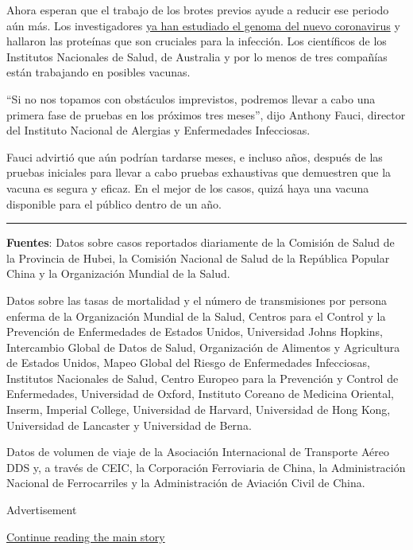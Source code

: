 Ahora esperan que el trabajo de los brotes previos ayude a reducir ese
periodo aún más. Los investigadores
\href{https://ncbiinsights.ncbi.nlm.nih.gov/2020/01/13/novel-coronavirus/}{ya
han estudiado el genoma del nuevo coronavirus} y hallaron las proteínas
que son cruciales para la infección. Los científicos de los Institutos
Nacionales de Salud, de Australia y por lo menos de tres compañías están
trabajando en posibles vacunas.

``Si no nos topamos con obstáculos imprevistos, podremos llevar a cabo
una primera fase de pruebas en los próximos tres meses'', dijo Anthony
Fauci, director del Instituto Nacional de Alergias y Enfermedades
Infecciosas.

Fauci advirtió que aún podrían tardarse meses, e incluso años, después
de las pruebas iniciales para llevar a cabo pruebas exhaustivas que
demuestren que la vacuna es segura y eficaz. En el mejor de los casos,
quizá haya una vacuna disponible para el público dentro de un año.

\begin{center}\rule{0.5\linewidth}{\linethickness}\end{center}

\textbf{Fuentes}: Datos sobre casos reportados diariamente de la
Comisión de Salud de la Provincia de Hubei, la Comisión Nacional de
Salud de la República Popular China y la Organización Mundial de la
Salud.

Datos sobre las tasas de mortalidad y el número de transmisiones por
persona enferma de la Organización Mundial de la Salud, Centros para el
Control y la Prevención de Enfermedades de Estados Unidos, Universidad
Johns Hopkins, Intercambio Global de Datos de Salud, Organización de
Alimentos y Agricultura de Estados Unidos, Mapeo Global del Riesgo de
Enfermedades Infecciosas, Institutos Nacionales de Salud, Centro Europeo
para la Prevención y Control de Enfermedades, Universidad de Oxford,
Instituto Coreano de Medicina Oriental, Inserm, Imperial College,
Universidad de Harvard, Universidad de Hong Kong, Universidad de
Lancaster y Universidad de Berna.

Datos de volumen de viaje de la Asociación Internacional de Transporte
Aéreo DDS y, a través de CEIC, la Corporación Ferroviaria de China, la
Administración Nacional de Ferrocarriles y la Administración de Aviación
Civil de China.

Advertisement

\protect\hyperlink{after-bottom}{Continue reading the main story}

